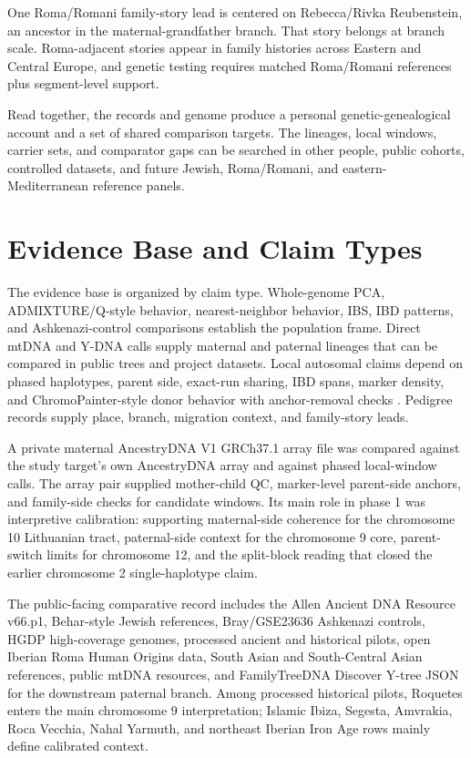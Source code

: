 \documentclass[11pt]{article}
\begin{document}
One Roma/Romani family-story lead is centered on Rebecca/Rivka Reubenstein, an ancestor in the maternal-grandfather branch. That story belongs at branch scale. Roma-adjacent stories appear in family histories across Eastern and Central Europe, and genetic testing requires matched Roma/Romani references plus segment-level support.

Read together, the records and genome produce a personal genetic-genealogical account and a set of shared comparison targets. The lineages, local windows, carrier sets, and comparator gaps can be searched in other people, public cohorts, controlled datasets, and future Jewish, Roma/Romani, and eastern-Mediterranean reference panels.

\section{Evidence Base and Claim Types}

The evidence base is organized by claim type. Whole-genome PCA, ADMIXTURE/Q-style behavior, nearest-neighbor behavior, IBS, IBD patterns, and Ashkenazi-control comparisons establish the population frame. Direct mtDNA and Y-DNA calls supply maternal and paternal lineages that can be compared in public trees and project datasets. Local autosomal claims depend on phased haplotypes, parent side, exact-run sharing, IBD spans, marker density, and ChromoPainter-style donor behavior with anchor-removal checks \citep{lawson2012}. Pedigree records supply place, branch, migration context, and family-story leads.

A private maternal AncestryDNA V1 GRCh37.1 array file was compared against the study target's own AncestryDNA array and against phased local-window calls. The array pair supplied mother-child QC, marker-level parent-side anchors, and family-side checks for candidate windows. Its main role in phase 1 was interpretive calibration: supporting maternal-side coherence for the chromosome 10 Lithuanian tract, paternal-side context for the chromosome 9 core, parent-switch limits for chromosome 12, and the split-block reading that closed the earlier chromosome 2 single-haplotype claim.

The public-facing comparative record includes the Allen Ancient DNA Resource v66.p1, Behar-style Jewish references, Bray/GSE23636 Ashkenazi controls, HGDP high-coverage genomes, processed ancient and historical pilots, open Iberian Roma Human Origins data, South Asian and South-Central Asian references, public mtDNA resources, and FamilyTreeDNA Discover Y-tree JSON for the downstream paternal branch. Among processed historical pilots, Roquetes enters the main chromosome 9 interpretation; Islamic Ibiza, Segesta, Amvrakia, Roca Vecchia, Nahal Yarmuth, and northeast Iberian Iron Age rows mainly define calibrated context.
\end{document}
